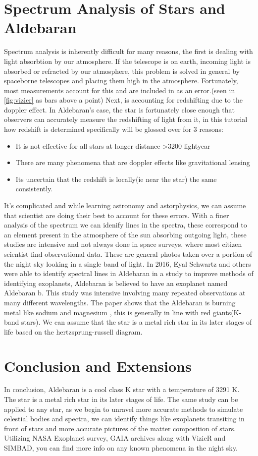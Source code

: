 \documentclass[12pt,oneside,a4paper,english]{article}
\begin{document}
\section{Spectrum Analysis of Stars and Aldebaran}
Spectrum analysis is inherently difficult for many reasons, the first is dealing with light absorbtion by our atmosphere. If the telescope is on earth, incoming light is absorbed or refracted by our atmosphere, this problem is solved in general by spaceborne telescopes and placing them high in the atmosphere. Fortunately, most measurements account for this and are included in as an error.(seen in \ref{fig:vizier} as bars above a point) Next, is accounting for redshifting due to the doppler effect. In Aldebaran's case, the star is fortunately close enough that observers can accurately measure the redshifting of light from it, in this tutorial how redshift is determined specifically will be glossed over for 3 reasons: 
\begin{itemize}
    \item It is not effective for all stars at longer distance >3200 lightyear
    \item There are many phenomena that are doppler effects like gravitational lensing
    \item Its uncertain that the redshift is locally(ie near the star) the same consistently.
\end{itemize}
It's complicated and while learning astronomy and astorphysics, we can assume that scientist are doing their best to account for these errors. With a finer analysis of the spectrum we can idenify lines in the spectra, these correspond to an element present in the atmosphere of the sun absorbing outgoing light, these studies are intensive and not always done in space surveys, where most citizen scientist find observational data. These are general photos taken over a portion of the night sky looking in a single band of light. In 2016, Eyal Schwartz and others were able to identify spectral lines in Aldebaran in a study to improve methods of identifying exoplanets, Aldebaran is believed to have an exoplanet named Aldebaran b. This study was intensive involving many repeated observations at many different wavelengths. The paper shows that the Aldebaran is burning metal like sodium and magnesium \cite{schwartz}, this is generally in line with red giants(K-band stars). We can assume that the star is a metal rich star in its later stages of life based on the hertzsprung-russell diagram. 

\newpage
\section{Conclusion and Extensions}
In conclusion, Aldebaran is a cool class K star with a temperature of 3291 K. The star is a metal rich star in its later stages of life. The same study can be applied to any star, as we begin to unravel more accurate methods to simulate celestial bodies and spectra, we can identify things like exoplanets transiting in front of stars and more accurate pictures of the matter composition of stars. Utilizing NASA Exoplanet survey, GAIA archives along with VizieR and SIMBAD, you can find more info on any known phenomena in the night sky.

 


\label{endOfDoc}
\end{document}
